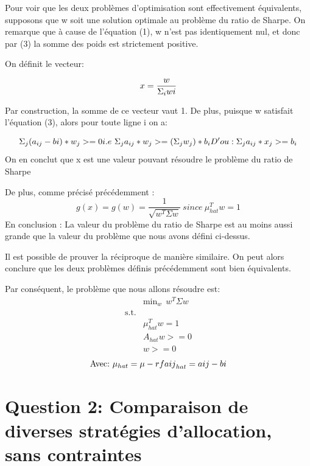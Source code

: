 \documentclass[
]{article}
\begin{document}
Pour voir que les deux problèmes d'optimisation sont effectivement
équivalents, supposons que w soit une solution optimale au problème du
ratio de Sharpe. On remarque que à cause de l'équation (1), w n'est pas
identiquement nul, et donc par (3) la somme des poids est strictement
positive.

On définit le vecteur:

\[
x = \frac{w}{\Sigma_{i}w{i}} \\
\]

Par construction, la somme de ce vecteur vaut 1. De plus, puisque w
satisfait l'équation (3), alors pour toute ligne i on a:

\[
\Sigma_{j}  (a_{ij} - b{i})*w_{j} >= 0 \\
 i.e \ \Sigma_{j} a_{ij}*w_{j} >= ( \Sigma_{j} w_{j})*b_{i} \\
 D'ou : \Sigma_{j} a_{ij}*x_{j} >= b_{i}
\] On en conclut que x est une valeur pouvant résoudre le problème du
ratio de Sharpe

De plus, comme précisé précédemment : \[
g(x) = g(w) = \frac{1}{\sqrt{w^T \Sigma w}} \ since \ \mu_{hat}^T w = 1
\] En conclusion : La valeur du problème du ratio de Sharpe est au moins
aussi grande que la valeur du problème que nous avons défini ci-dessus.

Il est possible de prouver la réciproque de manière similaire. On peut
alors conclure que les deux problèmes définis précédemment sont bien
équivalents.

Par conséquent, le problème que nous allons résoudre est: \[
\begin{aligned}
    & \mbox{min}_w \ \   {w^T  \Sigma  w} \\
    \mbox{s.t.} & \\
    & \mu_{hat}^T w = 1 \\
    & A_{hat} w >= 0 \\
    & w >= 0
\end{aligned}
\] \[
\mbox{Avec:} \
\mu_{hat} = \mu - rf \\
a{ij}_{hat} = a{ij} - b{i}
\]

\hypertarget{question-2-comparaison-de-diverses-stratuxe9gies-dallocation-sans-contraintes}{%
\section{Question 2: Comparaison de diverses stratégies d'allocation,
sans
contraintes}\label{question-2-comparaison-de-diverses-stratuxe9gies-dallocation-sans-contraintes}}
\end{document}
